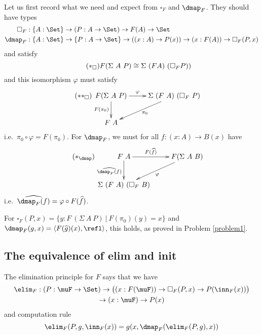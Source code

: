 \documentclass{article}
\begin{document}
Let us first record what we need and expect from $\square_F$ and $\dmap_F$. They should have types
\begin{align*}
\square_F &: \{A : \Set\} \to (P : A \to \Set) \to F(A) \to \Set \\
\dmap_F &: \{A : \Set\} \to \{P : A \to \Set\} \to ((x : A) \to  P(x)) \to (x : F(A)) \to \square_F(P, x)
\end{align*}
and satisfy
\begin{equation}
  \label{eq:square}
  \tag{$\ast_{\square}$}
F (\Sigma\ A\ P) \cong \Sigma\ (F A)\ (\square_F P))
\end{equation}
and this isomorphism $\varphi$ must satisfy
\begin{equation}
  \label{eq:square2}
  \tag{$\ast\ast_{\square}$}
\xymatrix
{
F(\Sigma\ A\ P) \ar^-{\varphi}[r] \ar_{F(\pi_0)}[d] & \Sigma\ (F\ A)\ (\square_F\ P) \ar^{\pi_0}[dl] \\
F\ A  & 
}
\end{equation}
i.e.\ $\pi_0 \circ \varphi = F(\pi_0)$. For $\dmap_F$, we must for all $f : (x : A) \to B(x)$ have
\begin{equation}
  \label{eq:dmap}
  \tag{$\ast_{\dmap}$}
\xymatrix{
F\ A \ar^-{F(\widehat{f})}[r] \ar_{\widehat{\dmap_F(f)}}[d]& F(\Sigma\ A\ B) \ar^{\varphi}[dl] \\
\Sigma\ (F\ A)\ (\square_F\ B) & 
}
\end{equation}
i.e.\ $\widehat{\dmap_F(f)} = \varphi \circ F(\widehat{f})$.

For $\square_F(P, x) = \{ y : F\ (\Sigma\ A\ P )\ |\ F(\pi_0)(y) = x\}$ and $\dmap_F(g, x) = \langle F(\widehat{g})(x), \refl\rangle$, this holds, as proved in Problem \ref{problem1}.

\subsection*{The equivalence of elim and init}

\begin{principle}[Elim]
  The elimination principle for $F$ says that we have
\begin{multline*}
\elim_F : (P : \muF \to \Set) \to \big( (x : F(\muF)) \to \square_F(P, x) \to P(\inn_F(x))\big) \\ \to (x : \muF) \to P(x)
\end{multline*}
and computation rule
\[
\elim_F(P, g, \inn_F(x)) = g(x, \dmap_F(\elim_F(P, g), x))
\]
\end{principle}
\end{document}
